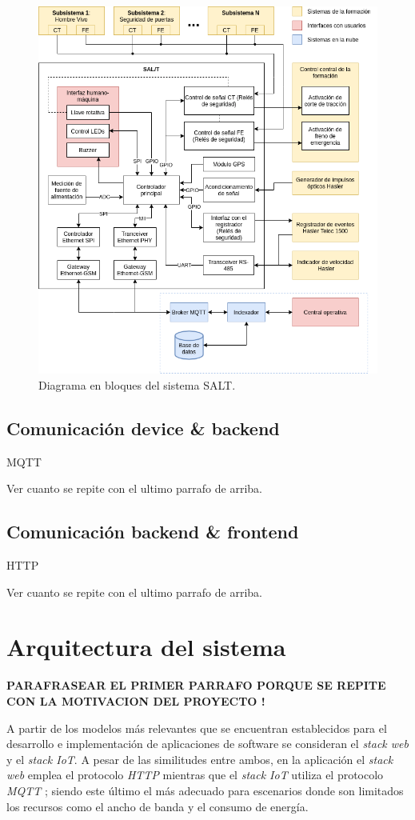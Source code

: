 \begin{figure}[htpb]
\centering 
\includegraphics[width=.8\textwidth]{Figures/diagrama_salt_con_central.png}
\caption{Diagrama en bloques del sistema SALT.}
\label{fig:diagBloques}
\end{figure}

\subsection{Comunicación device & backend}

MQTT

Ver cuanto se repite con el ultimo parrafo de arriba.

\subsection{Comunicación backend & frontend}

HTTP

Ver cuanto se repite con el ultimo parrafo de arriba.


\section{Arquitectura del sistema}


\textbf{PARAFRASEAR EL PRIMER PARRAFO PORQUE SE REPITE CON LA MOTIVACION DEL PROYECTO !}

A partir de los modelos más relevantes que se encuentran establecidos para el desarrollo e implementación de aplicaciones de software se consideran el \textit{stack web} y el \textit{stack IoT}. A pesar de las similitudes entre ambos, en la aplicación el \textit{stack web} emplea el protocolo \textit{HTTP} \cite{b5} mientras que el \textit{stack IoT} utiliza el protocolo \textit{MQTT} \cite{b6}; siendo este último el más adecuado para escenarios donde son limitados los recursos como el ancho de banda y el consumo de energía.

